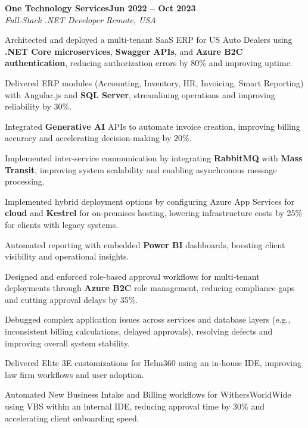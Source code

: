 \documentclass[letterpaper,10pt]{article}
\newcommand{\headingBf}[2]{
  \hspace{10pt}\textbf{#1}\hfill\textbf{#2}\\
}
\newcommand{\headingIt}[2]{
  \hspace{10pt}\textit{#1}\hfill\textit{#2}\\
}
\newenvironment{resume_list}{
  \vspace{-7pt}
  \begin{itemize}[itemsep=-2px, parsep=1pt, leftmargin=30pt]
}{
  \end{itemize}
}
\begin{document}
\headingBf{One Technology Services}{Jun 2022 -- Oct 2023}
\headingIt{Full-Stack .NET Developer \hfill Remote, USA}{}
\begin{resume_list}
    \item Architected and deployed a multi-tenant SaaS ERP for US Auto Dealers using \textbf{.NET Core microservices}, \textbf{Swagger APIs}, and \textbf{Azure B2C authentication}, reducing authorization errors by 80\% and improving uptime.
    \item Delivered ERP modules (Accounting, Inventory, HR, Invoicing, Smart Reporting) with Angular.js and \textbf{SQL Server}, streamlining operations and improving reliability by 30\%.
    \item Integrated \textbf{Generative AI} APIs to automate invoice creation, improving billing accuracy and accelerating decision-making by 20\%.
    \item Implemented inter-service communication by integrating \textbf{RabbitMQ} with \textbf{Mass Transit}, improving system scalability and enabling asynchronous message processing.
    \item Implemented hybrid deployment options by configuring Azure App Services for \textbf{cloud} and \textbf{Kestrel} for on-premises hosting, lowering infrastructure costs by 25\% for clients with legacy systems.
    \item Automated reporting with embedded \textbf{Power BI} dashboards, boosting client visibility and operational insights.   
    \item Designed and enforced role-based approval workflows for multi-tenant deployments through \textbf{Azure B2C} role management, reducing compliance gaps and cutting approval delays by 35\%.
    \item Debugged complex application issues across services and database layers (e.g., inconsistent billing calculations, delayed approvals), resolving defects and improving overall system stability.
    \item Delivered Elite 3E customizations for Helm360 using an in-house IDE, improving law firm workflows and user adoption.
    \item Automated New Business Intake and Billing workflows for WithersWorldWide using VBS within an internal IDE, reducing approval time by 30\% and accelerating client onboarding speed.
\end{resume_list}
\end{document}
